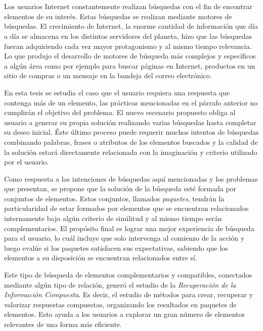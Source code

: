 \chapter*{\runtitulo}

\noindent 

Los usuarios Internet constantemente realizan búsquedas
con el fin de encontrar elementos de su interés. Estas búsquedas se realizan mediante motores de búsquedas. El crecimiento de Internet, la enorme cantidad de información que día a día se almacena en los distintos servidores del planeta, hizo que las búsquedas fueran adquiriendo cada vez mayor protagonismo y al mismo tiempo relevancia. Lo que produjo el desarrollo de motores de búsqueda más complejos y específicos a algún área como por ejemplo para buscar páginas en Internet, productos en un sitio de compras o un mensaje en la bandeja del correo electrónico.

En esta tesis se estudia el caso que el usuario requiera una respuesta que contenga más de un elemento, las prácticas mencionadas en el párrafo anterior no cumplirán el objetivo del problema. El nuevo escenario propuesto obliga al usuario a generar su propia solución realizando varias búsquedas hasta completar su deseo inicial. Éste último proceso puede requerir muchos intentos de búsquedas combinando palabras, frases o atributos de los elementos buscados y la calidad de la solución estará directamente relacionada con la imaginación y criterio utilizado por el usuario.

Como respuesta a las intenciones de búsquedas aquí mencionadas y los problemas que presentan, se propone que la solución de la búsqueda esté formada por conjuntos de elementos. Estos conjuntos, llamados {\em paquetes}, tendrán la particularidad de estar formados por elementos que se encuentran relacionados internamente bajo algún criterio de similitud y al mismo tiempo serán complementarios. El propósito final es lograr una mejor experiencia de búsqueda para el usuario, lo cuál incluye que solo intervenga al comienzo de la acción y luego evalúe si los paquetes satisfacen sus expectativas, sabiendo que los elementos a su disposición se encuentran relacionados entre sí.

Este tipo de búsqueda de elementos complementarios y compatibles, conectados mediante algún tipo de relación, generó el estudio de la {\em Recuperación de la Información Compuesta}. Es decir, el estudio de métodos para crear, recuperar y valorizar respuestas compuestas, organizando los resultados en paquetes de elementos. Esto ayuda a los usuarios a explorar un gran número de elementos relevantes de una forma más eficiente.

